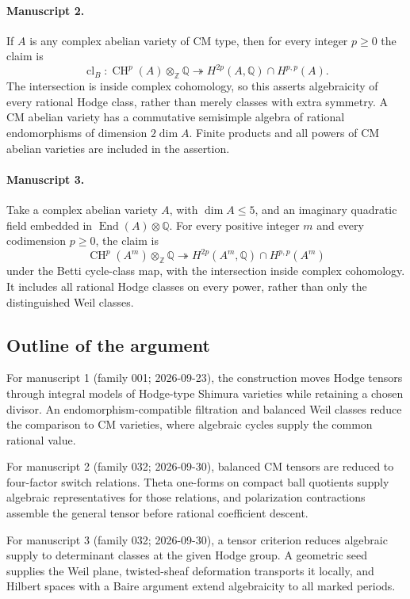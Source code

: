 \documentclass[11pt]{article}
\begin{document}
\paragraph{Manuscript 2.}
If $A$ is any complex abelian variety of CM type, then for every integer $p\ge0$ the claim is
\[
 \operatorname{cl}_B:\operatorname{CH}^p(A)\otimes_{\mathbb Z}\mathbb Q
       \twoheadrightarrow H^{2p}(A,\mathbb Q)\cap H^{p,p}(A).
\]
The intersection is inside complex cohomology, so this asserts algebraicity of every rational Hodge class, rather than merely classes with extra symmetry. A CM abelian variety has a commutative semisimple algebra of rational endomorphisms of dimension $2\dim A$. Finite products and all powers of CM abelian varieties are included in the assertion.

\paragraph{Manuscript 3.}
Take a complex abelian variety $A$, with $\dim A\le5$, and an imaginary quadratic field embedded in $\operatorname{End}(A)\otimes\mathbb Q$. For every positive integer $m$ and every codimension $p\ge0$, the claim is
\[
 \operatorname{CH}^p(A^m)\otimes_{\mathbb Z}\mathbb Q
 \twoheadrightarrow H^{2p}(A^m,\mathbb Q)\cap H^{p,p}(A^m)
\]
under the Betti cycle-class map, with the intersection inside complex cohomology. It includes all rational Hodge classes on every power, rather than only the distinguished Weil classes.

\subsection{Outline of the argument}
For manuscript 1 (family 001; 2026-09-23), the construction moves Hodge tensors through integral models of Hodge-type Shimura varieties while retaining a chosen divisor. An endomorphism-compatible filtration and balanced Weil classes reduce the comparison to CM varieties, where algebraic cycles supply the common rational value.

For manuscript 2 (family 032; 2026-09-30), balanced CM tensors are reduced to four-factor switch relations. Theta one-forms on compact ball quotients supply algebraic representatives for those relations, and polarization contractions assemble the general tensor before rational coefficient descent.

For manuscript 3 (family 032; 2026-09-30), a tensor criterion reduces algebraic supply to determinant classes at the given Hodge group. A geometric seed supplies the Weil plane, twisted-sheaf deformation transports it locally, and Hilbert spaces with a Baire argument extend algebraicity to all marked periods.
\end{document}
